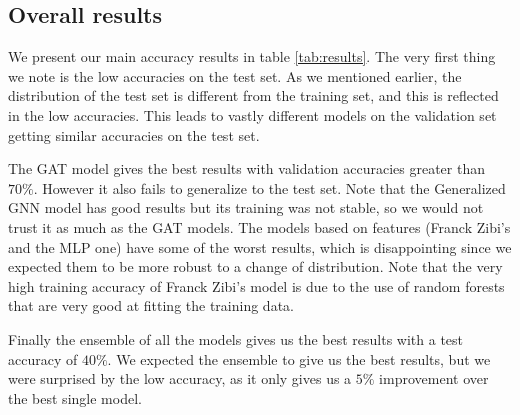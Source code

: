 \documentclass[switch, 11pt]{article}
\begin{document}
\begin{multicols}{2}
    \subsection{Overall results}

    We present our main accuracy results in table \ref{tab:results}. The very first thing we note is the low accuracies on the test set. As we mentioned earlier, the distribution of the test set is different from the training set, and this is reflected in the low accuracies. This leads to vastly different models on the validation set getting similar accuracies on the test set.

    The GAT model gives the best results with validation accuracies greater than $70\%$. However it also fails to generalize to the test set. Note that the Generalized GNN model has good results but its training was not stable, so we would not trust it as much as the GAT models. The models based on features (Franck Zibi's and the MLP one) have some of the worst results, which is disappointing since we expected them to be more robust to a change of distribution. Note that the very high training accuracy of Franck Zibi's model is due to the use of random forests that are very good at fitting the training data.

    Finally the ensemble of all the models gives us the best results with a test accuracy of $40\%$. We expected the ensemble to give us the best results, but we were surprised by the low accuracy, as it only gives us a $5\%$ improvement over the best single model.


\end{multicols}
\end{document}
